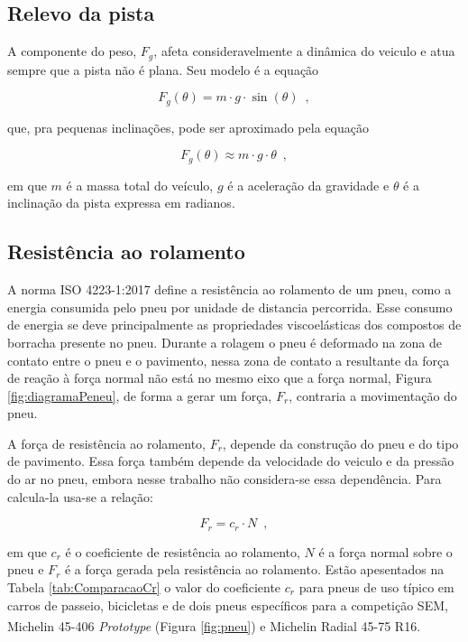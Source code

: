 \subsection{Relevo da pista}

A componente do peso, $F_{g}$, afeta consideravelmente a dinâmica do veiculo e atua sempre que a pista não é plana. Seu modelo é a equação

\[
	F_{g}(\theta) = m \cdot g \cdot \sin(\theta)
	\enspace,
\]

que, pra pequenas inclinações, pode ser aproximado pela equação

\begin{equation}
	\label{eq:Fg}
	F_{g}(\theta) \approx  m \cdot g \cdot \theta
	\enspace,
\end{equation}

em que $m$ é a massa total do veículo, $g$ é a aceleração da gravidade e $\theta$ é a inclinação da pista expressa em
radianos\cite{book:guzzella2012vehicle}.

\subsection{Resistência ao rolamento}
\label{subsec:resistencia_rolamento}

A norma ISO 4223-1:2017 define a resistência ao rolamento de um pneu, como a energia consumida pelo pneu por unidade de distancia
percorrida. Esse consumo de energia se deve principalmente as propriedades viscoelásticas dos compostos de borracha presente no pneu.
Durante a rolagem o pneu é deformado na zona de contato entre o pneu e o pavimento, nessa zona de contato a resultante da força de reação à força
normal não
está no mesmo eixo que a força normal, Figura \ref{fig:diagramaPeneu}, de forma a gerar um força, $F_{r}$, contraria a movimentação do pneu.



A força de resistência ao rolamento, $F_{r}$, depende da construção do pneu e do tipo de pavimento. Essa força também depende da velocidade do
veiculo e da pressão do ar no pneu,
embora nesse trabalho não considera-se essa dependência. Para calcula-la usa-se a relação:

\begin{equation}
	\label{eq:Fr}
	F_{r}  = c_{r} \cdot N
	\enspace,
\end{equation}

em que $c_{r}$ é o coeficiente de resistência ao rolamento, $N$ é a força normal sobre o pneu e $F_{r}$ é a força
gerada pela resistência ao rolamento.
Estão apesentados na Tabela \ref{tab:ComparacaoCr}
o valor do coeficiente $c_{r}$ para pneus de uso típico em carros de passeio, bicicletas e de dois pneus específicos para a competição SEM,
Michelin\textsuperscript{\textregistered}
45-406 \textit{Prototype} (Figura \ref{fig:pneu}) e Michelin\textsuperscript{\textregistered} Radial 45-75 R16.


